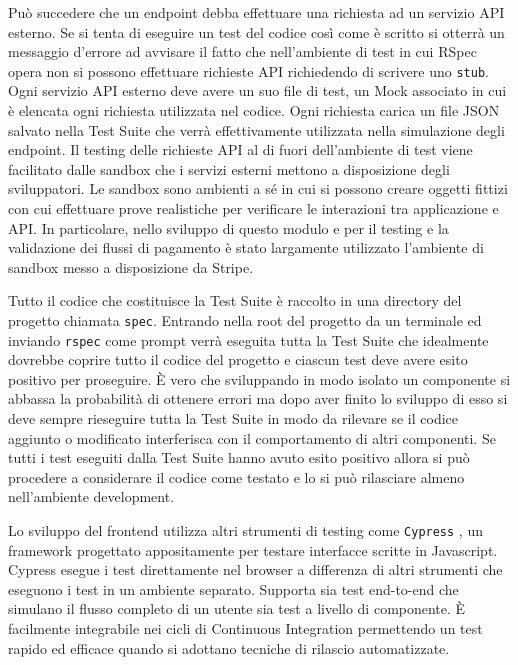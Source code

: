 \documentclass[target=bach,aauheader=,style=]{thud}
\begin{document}
Può succedere che un endpoint debba effettuare una richiesta ad un servizio API esterno. Se si tenta di eseguire un test del codice così come è scritto si otterrà un messaggio d'errore ad avvisare
il fatto che nell'ambiente di test in cui RSpec opera non si possono effettuare richieste API richiedendo di scrivere uno \texttt{stub}. Ogni servizio API esterno deve avere un suo file di test,
un Mock associato in cui è elencata ogni richiesta utilizzata nel codice. Ogni richiesta carica un file JSON salvato nella Test Suite che verrà effettivamente utilizzata nella simulazione degli endpoint.
Il testing delle richieste API al di fuori dell'ambiente di test viene facilitato dalle sandbox che i servizi esterni mettono a disposizione degli sviluppatori. Le sandbox sono ambienti a sé in
cui si possono creare oggetti fittizi con cui effettuare prove realistiche per verificare le interazioni tra applicazione e API. In particolare, nello sviluppo di questo modulo e per il testing e
la validazione dei flussi di pagamento è stato largamente utilizzato l'ambiente di sandbox \cite{stripe_sandbox_env} messo a disposizione da Stripe.

Tutto il codice che costituisce la Test Suite è raccolto in una directory del progetto chiamata \texttt{spec}. Entrando nella root del progetto da un terminale ed inviando \texttt{rspec} come prompt
verrà eseguita tutta la Test Suite che idealmente dovrebbe coprire tutto il codice del progetto e ciascun test deve avere esito positivo per proseguire. È vero che sviluppando in modo isolato un
componente si abbassa la probabilità di ottenere errori ma dopo aver finito lo sviluppo di esso si deve sempre rieseguire tutta la Test Suite in modo da rilevare se il codice aggiunto o modificato
interferisca con il comportamento di altri componenti. Se tutti i test eseguiti dalla Test Suite hanno avuto esito positivo allora si può procedere a considerare il codice come testato e lo si può
rilasciare almeno nell'ambiente development.

Lo sviluppo del frontend utilizza altri strumenti di testing come \texttt{Cypress} \cite{cypress}, un framework progettato appositamente per testare interfacce scritte in Javascript.
Cypress esegue i test direttamente nel browser a differenza di altri strumenti che eseguono i test in un ambiente separato. Supporta sia test end-to-end che simulano il flusso completo di un utente sia
test a livello di componente. È facilmente integrabile nei cicli di Continuous Integration permettendo un test rapido ed efficace quando si adottano tecniche di rilascio automatizzate.
\end{document}
